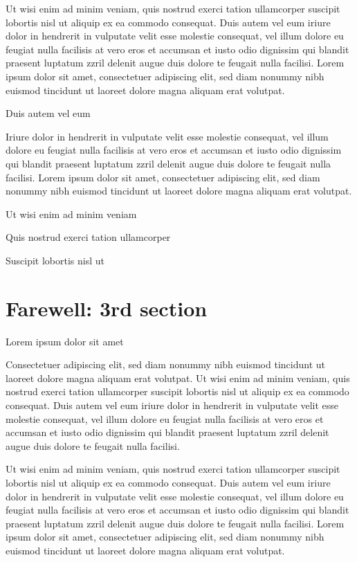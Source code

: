 \documentclass[11pt,twoside]{article}\makeatletter
\makeatletter
\renewcommand\section{\@startsection {section}{1}{\z@}%
     {-1.75ex \@plus -0.5ex \@minus -.2ex}%
     {0.5ex \@plus .2ex}%
     {\reset@font\Large\bfseries\sffamily}}
\def\DivI{\section}
\def\DivI{\chapter}
\makeatother
\begin{document}
Ut wisi enim ad minim veniam, quis nostrud exerci tation       ullamcorper suscipit lobortis nisl ut aliquip ex ea commodo       consequat. Duis autem vel eum iriure dolor in hendrerit in vulputate       velit esse molestie consequat, vel illum dolore eu feugiat nulla       facilisis at vero eros et accumsan et iusto odio dignissim qui blandit       praesent luptatum zzril delenit augue duis dolore te feugait nulla       facilisi. Lorem ipsum dolor sit amet, consectetuer adipiscing elit,       sed diam nonummy nibh euismod tincidunt ut laoreet dolore magna       aliquam erat volutpat. \par
Duis autem vel eum \par
Iriure dolor in hendrerit in vulputate velit esse molestie       consequat, vel illum dolore eu feugiat nulla facilisis at vero eros et       accumsan et iusto odio dignissim qui blandit praesent luptatum zzril       delenit augue duis dolore te feugait nulla facilisi. Lorem ipsum dolor       sit amet, consectetuer adipiscing elit, sed diam nonummy nibh euismod       tincidunt ut laoreet dolore magna aliquam erat volutpat. \par
Ut wisi enim ad minim veniam\par
Quis nostrud exerci tation ullamcorper \par
Suscipit lobortis nisl ut 
\DivI[Farewell: 3rd section]{Farewell: 3rd section}\label{part3}\par
Lorem ipsum dolor sit amet\par
Consectetuer adipiscing elit, sed diam nonummy nibh euismod       tincidunt ut laoreet dolore magna aliquam erat volutpat. Ut wisi enim       ad minim veniam, quis nostrud exerci tation ullamcorper suscipit       lobortis nisl ut aliquip ex ea commodo consequat. Duis autem vel eum       iriure dolor in hendrerit in vulputate velit esse molestie consequat,       vel illum dolore eu feugiat nulla facilisis at vero eros et accumsan       et iusto odio dignissim qui blandit praesent luptatum zzril delenit       augue duis dolore te feugait nulla facilisi.\par
Ut wisi enim ad minim veniam, quis nostrud exerci tation       ullamcorper suscipit lobortis nisl ut aliquip ex ea commodo       consequat. Duis autem vel eum iriure dolor in hendrerit in vulputate       velit esse molestie consequat, vel illum dolore eu feugiat nulla       facilisis at vero eros et accumsan et iusto odio dignissim qui blandit       praesent luptatum zzril delenit augue duis dolore te feugait nulla       facilisi. Lorem ipsum dolor sit amet, consectetuer adipiscing elit,       sed diam nonummy nibh euismod tincidunt ut laoreet dolore magna       aliquam erat volutpat. \par
\end{document}
